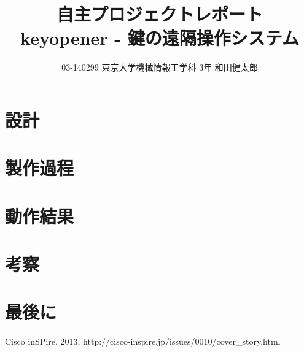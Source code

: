 \documentclass[a4paper,10pt]{jarticle}
\title{自主プロジェクトレポート \\ keyopener - 鍵の遠隔操作システム}
\author{03-140299 東京大学機械情報工学科 3年 和田健太郎}
\begin{document}
\maketitle







\section{設計}

\section{製作過程}

\section{動作結果}

\section{考察}
\section{最後に}


\begin{thebibliography}{9}
   Cisco inSPire, 2013, http://cisco-inspire.jp/issues/0010/cover\_story.html
\end{thebibliography}
\end{document}
